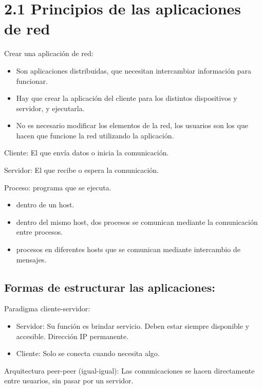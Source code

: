 \documentclass[12pt, twoside, openright]{report} %
\begin{document}
\section{2.1 Principios de las aplicaciones de red}

Crear una aplicación de red:

\begin{itemize}
	\item Son aplicaciones distribuidas, que necesitan intercambiar
	      información para funcionar.
	\item Hay que crear la aplicación del cliente para los distintos
	      dispositivos y servidor, y ejecutarla.
	\item No es necesario modificar los elementos de la red, los usuarios
	      son los que hacen que funcione la red utilizando la aplicación.
\end{itemize}

Cliente: El que envía datos o inicia la comunicación.

Servidor: El que recibe o espera la comunicación.

Proceso: programa que se ejecuta.

\begin{itemize}
	\item dentro de un host.
	\item dentro del mismo host, dos procesos se comunican mediante la
	      comunicación entre procesos.
	\item procesos en diferentes hosts que se comunican mediante intercambio
	      de mensajes.
\end{itemize}


\subsection{Formas de estructurar las aplicaciones:}

Paradigma cliente-servidor:

\begin{itemize}
	\item Servidor: Su función es brindar servicio. Deben estar siempre
	      disponible y accesible. Dirección IP permanente.
	\item Cliente: Solo se conecta cuando necesita algo.
\end{itemize}

Arquitectura peer-peer (igual-igual): Las comunicaciones se hacen
directamente entre usuarios, sin pasar por un servidor.
\end{document}
